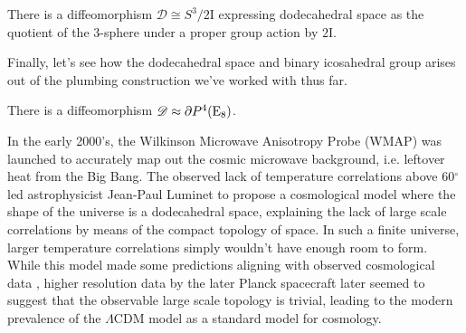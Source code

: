 \begin{proposition}
	There is a diffeomorphism $\mathscr{D} \cong S^3 / 2\mathrm{I}$ expressing dodecahedral space as the quotient of the $3$-sphere under a proper group action by $2\mathrm{I}$.
\end{proposition}

Finally, let's see how the dodecahedral space and binary icosahedral group arises out of the plumbing construction we've worked with thus far.


\begin{proposition}
	There is a diffeomorphism $\mathscr{D}\approx \partial P^4({\operatorname{E}}_8)$.
\end{proposition}


\begin{remark}
	In the early 2000's, the Wilkinson Microwave Anisotropy Probe (WMAP) was launched to accurately map out the cosmic microwave background, i.e. leftover heat from the Big Bang. The observed lack of temperature correlations above 60$^\circ$ led astrophysicist Jean-Paul Luminet to propose a cosmological model \cite{luminet2003dodecahedral} where the shape of the universe is a dodecahedral space, explaining the lack of large scale correlations by means of the compact topology of space. In such a finite universe, larger temperature correlations simply wouldn't have enough room to form.
	While this model made some predictions aligning with observed cosmological data
	\cite{roukema2008dodecahedral}, higher resolution data by the later Planck spacecraft later seemed to suggest that the observable large scale topology is trivial, leading to the modern prevalence of the $\Lambda$CDM model as a standard model for cosmology.
\end{remark}

